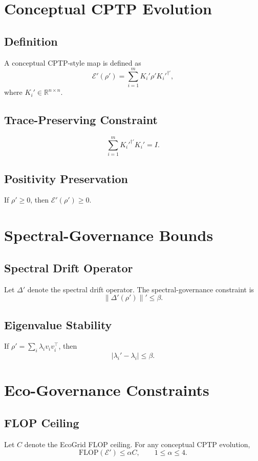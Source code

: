 \documentclass[11pt]{article}
\begin{document}
\section{Conceptual CPTP Evolution}

\subsection{Definition}
A conceptual CPTP-style map is defined as
\[
\mathcal{E}'(\rho') = \sum_{i=1}^m K_i' \rho' K_i'^{\dagger'},
\]
where $K_i' \in \mathbb{R}^{n \times n}$.

\subsection{Trace-Preserving Constraint}
\[
\sum_{i=1}^m K_i'^{\dagger'} K_i' = I.
\]

\subsection{Positivity Preservation}
If $\rho' \ge 0$, then $\mathcal{E}'(\rho') \ge 0$.

\section{Spectral-Governance Bounds}

\subsection{Spectral Drift Operator}
Let $\Delta'$ denote the spectral drift operator.  
The spectral-governance constraint is
\[
\|\Delta'(\rho')\|' \le \beta.
\]

\subsection{Eigenvalue Stability}
If $\rho' = \sum_i \lambda_i v_i v_i^\top$, then
\[
|\lambda_i' - \lambda_i| \le \beta.
\]

\section{Eco-Governance Constraints}

\subsection{FLOP Ceiling}
Let $C$ denote the EcoGrid FLOP ceiling.  
For any conceptual CPTP evolution,
\[
\mathrm{FLOP}(\mathcal{E}') \le \alpha C, \qquad 1 \le \alpha \le 4.
\]
\end{document}
